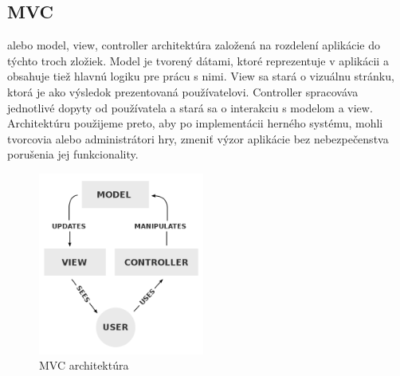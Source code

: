 \subsection{MVC} alebo model, view, controller architektúra založená na rozdelení aplikácie do týchto troch zložiek. Model je tvorený dátami, ktoré reprezentuje v aplikácii a obsahuje tiež hlavnú logiku pre prácu s nimi. View sa stará o vizuálnu stránku, ktorá je ako výsledok prezentovaná používatelovi. Controller spracováva jednotlivé dopyty od používatela a stará sa o interakciu s modelom a view. Architektúru použijeme preto, aby po implementácii herného systému, mohli tvorcovia alebo administrátori hry, zmeniť výzor aplikácie bez nebezpečenstva porušenia jej funkcionality.
\begin{figure}[h]
  \centering
  \includegraphics[height=6cm]{mainmatter/imgs/mvc.png}
  \caption{MVC architektúra}
  \label{fig:comenius}
\end{figure}



